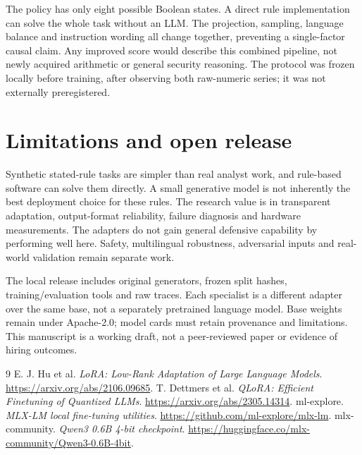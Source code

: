 \documentclass[11pt]{article}
\begin{document}
The policy has only eight possible Boolean states. A direct rule implementation can solve the whole task without an LLM. The projection, sampling, language balance and instruction wording all change together, preventing a single-factor causal claim. Any improved score would describe this combined pipeline, not newly acquired arithmetic or general security reasoning. The protocol was frozen locally before training, after observing both raw-numeric series; it was not externally preregistered.

\section{Limitations and open release}
Synthetic stated-rule tasks are simpler than real analyst work, and rule-based software can solve them directly. A small generative model is not inherently the best deployment choice for these rules. The research value is in transparent adaptation, output-format reliability, failure diagnosis and hardware measurements. The adapters do not gain general defensive capability by performing well here. Safety, multilingual robustness, adversarial inputs and real-world validation remain separate work.

The local release includes original generators, frozen split hashes, training/evaluation tools and raw traces. Each specialist is a different adapter over the same base, not a separately pretrained language model. Base weights remain under Apache-2.0; model cards must retain provenance and limitations. This manuscript is a working draft, not a peer-reviewed paper or evidence of hiring outcomes.

\begin{thebibliography}{9}
 E. J. Hu et al. \emph{LoRA: Low-Rank Adaptation of Large Language Models}. \url{https://arxiv.org/abs/2106.09685}.
 T. Dettmers et al. \emph{QLoRA: Efficient Finetuning of Quantized LLMs}. \url{https://arxiv.org/abs/2305.14314}.
 ml-explore. \emph{MLX-LM local fine-tuning utilities}. \url{https://github.com/ml-explore/mlx-lm}.
 mlx-community. \emph{Qwen3 0.6B 4-bit checkpoint}. \url{https://huggingface.co/mlx-community/Qwen3-0.6B-4bit}.
\end{thebibliography}
\end{document}
